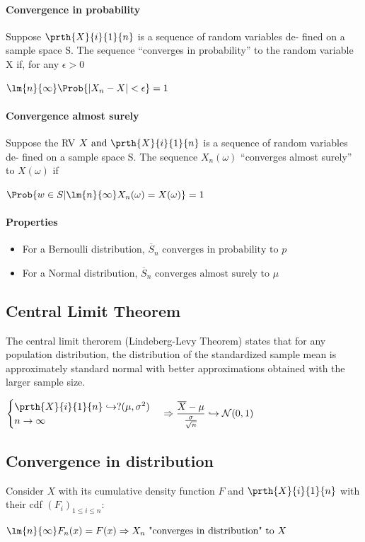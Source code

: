 \paragraph{Convergence in probability}
Suppose $\prth{X}{i}{1}{n}$ is a sequence of random variables de-
fined on a sample space S. The sequence ``converges in probability'' to the
random variable X if, for any $\epsilon>0$
\begin{center}
	$\lm{n}{\infty}\Prob{\left|X_{n}-X\right|<\epsilon}=1$
\end{center}
\paragraph{Convergence almost surely}
Suppose the RV $X\text{ and }\prth{X}{i}{1}{n}$ is a sequence of random variables de-
fined on a sample space S. The sequence $X_{n}(\omega)$ ``converges almost surely'' to $X(\omega)$ if
\begin{center}
	$\Prob{w\in S|\lm{n}{\infty}X_{n}(\omega)=X(\omega)}=1$
\end{center}
\paragraph{Properties}
\begin{itemize}
	\item For a Bernoulli distribution, $\overline{S}_{n}\text{ converges in probability to }p$
	\item For a Normal distribution, $\overline{S}_{n}\text{ converges almost surely to }\mu$
\end{itemize}


\subsection{Central Limit Theorem}
The central limit therorem (Lindeberg-Levy Theorem) states that for any
population distribution, the distribution of the standardized sample mean
is approximately standard normal with better approximations obtained with
the larger sample size.
\begin{center}
    $\begin{cases}\prth{X}{i}{1}{n}\hookrightarrow ?(\mu,\sigma^{2})\\ n\rightarrow\infty\end{cases} \Rightarrow \dfrac{\overline{X}-\mu}{\frac{\sigma}{\sqrt{n}}} \hookrightarrow \mathcal{N}(0, 1)$
\end{center}
\subsection{Convergence in distribution}
Consider $X$ with its cumulative density function $F$ and $\prth{X}{i}{1}{n}$ with their 
cdf $\left( F_{i} \right)_{1\leq i\leq n}$:
\begin{center}
	$\lm{n}{\infty}F_{n}(x)=F(x)\Rightarrow X_{n}\text{ "converges in distribution" to }X$
\end{center}
